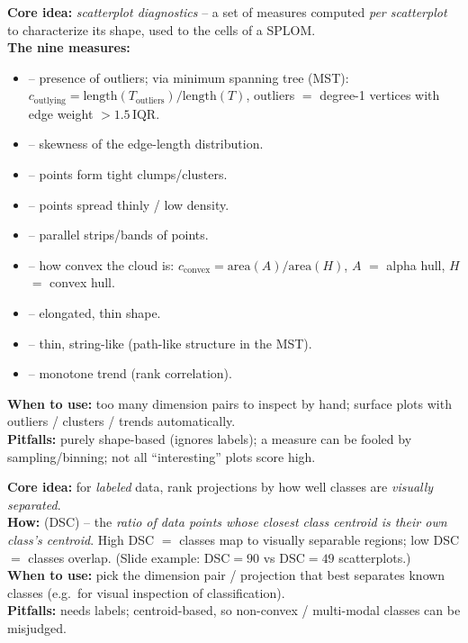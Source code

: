 \begin{algobox}
\textbf{Core idea:} \emph{scatterplot diagnostics} -- a set of measures computed
\emph{per scatterplot} to characterize its shape, used to  the cells
of a SPLOM.\\
\textbf{The nine measures:}
\begin{itemize}
\item {} -- presence of outliers; via minimum spanning tree (MST):
      $c_{\text{outlying}}=\text{length}(T_{\text{outliers}})/\text{length}(T)$,
      outliers $=$ degree-1 vertices with edge weight $>1.5\,\text{IQR}$.
\item {} -- skewness of the edge-length distribution.
\item {} -- points form tight clumps/clusters.
\item {} -- points spread thinly / low density.
\item {} -- parallel strips/bands of points.
\item {} -- how convex the cloud is:
      $c_{\text{convex}}=\text{area}(A)/\text{area}(H)$, $A$ $=$ alpha hull,
      $H$ $=$ convex hull.
\item {} -- elongated, thin shape.
\item {} -- thin, string-like (path-like structure in the MST).
\item {} -- monotone trend (rank correlation).
\end{itemize}
\textbf{When to use:} too many dimension pairs to inspect by hand; surface plots
with outliers / clusters / trends automatically.\\
\textbf{Pitfalls:} purely shape-based (ignores labels); a measure can be fooled
by sampling/binning; not all ``interesting'' plots score high.
\end{algobox}

\begin{algobox}
\textbf{Core idea:} for \emph{labeled} data, rank projections by how well classes
are \emph{visually separated}.\\
\textbf{How:}  (DSC) -- the \emph{ratio of data points
whose closest class centroid is their own class's centroid}. High DSC $=$ classes
map to visually separable regions; low DSC $=$ classes overlap. (Slide example:
DSC$=90$ vs DSC$=49$ scatterplots.)\\
\textbf{When to use:} pick the dimension pair / projection that best separates
known classes (e.g.\ for visual inspection of classification).\\
\textbf{Pitfalls:} needs labels; centroid-based, so non-convex / multi-modal
classes can be misjudged.
\end{algobox}


